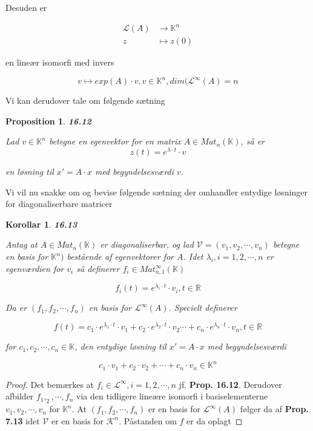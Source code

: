 \documentclass[paper=a4, fontsize=11pt]{scrartcl} %
\newtheorem*{korollar}{Korollar}
\newtheorem*{proposition}{Proposition}
\newenvironment{cstmproposition}[1]{\begin{proposition} {\normalfont\textbf{#1}}}{\end{proposition}}
\newenvironment{cstmkorollar}[1]{\begin{korollar} {\normalfont\textbf{#1}}}{\end{korollar}}
\begin{document}
			Desuden er 
			
			\begin{align*}
			\mathcal{L}(A) &\rightarrow \mathbb{K}^n\\
			z &\mapsto z(0)
			\end{align*}
			
			en lineær isomorfi med invers
			
			\[v \mapsto exp(A) \cdot v, v \in \mathbb{K}^n, dim(\mathcal{L}^{\infty}(A) = n\]
			
			Vi kan derudover tale om følgende sætning
			
			\begin{cstmproposition}{16.12}
				
				Lad $v \in \mathbb{K}^n$ betegne en egenvektor for en matrix $A \in Mat_n(\mathbb{K})$, så er 
				\[z(t) = e^{\lambda \cdot t} \cdot v\]
				
				en løsning til $x' = A \cdot x$ med begyndelsesværdi $v$.
				
			\end{cstmproposition}
			
			
			Vi vil nu snakke om og bevise følgende sætning der omhandler entydige løsninger for diagonaliserbare matricer
			
			\begin{cstmkorollar}{16.13}
				
				
				Antag at $A \in Mat_n(\mathbb{K})$ er diagonaliserbar, og lad $\mathcal{V} = (v_1,v_2,\cdots,v_n)$ betegne en basis for $\mathbb{K}^n)$ bestående af egenvektorer for $A$. Idet $\lambda_i, i = 1,2,\cdots,n$ er egenværdien for $v_i$ så definerer $f_i \in Mat_{n,1}^{\infty}(\mathbb{K})$ 
				
				\[f_i(t) = e^{\lambda_i \cdot t} \cdot v_i, t \in \mathbb{R}\]
				
				Da er $(f_1,f_2,\cdots,f_n)$ en basis for $\mathcal{L}^{\infty}(A)$. Specielt definerer
				
				\[f(t) = c_1 \cdot e^{\lambda_1 \cdot t} \cdot v_1 + c_2 \cdot e^{\lambda_2 \cdot t} \cdot v_2 \cdots + c_n \cdot e^{\lambda_n \cdot t} \cdot v_n, t \in \mathbb{R}\]
				
				for $c_1,c_2,\cdots,c_n \in \mathbb{K}$, den entydige løsning til $x' = A \cdot x$ med begyndelsesværdi 
				
				\[c_1 \cdot v_1 + c_2 \cdot v_2 + \cdots + c_n \cdot v_n \in \mathbb{K}^n\] 
				
			\end{cstmkorollar}
			
			\begin{proof}
				
				Det bemærkes at $f_i \in \mathcal{L}^{\infty}, i = 1,2,\cdots,n$ jf. \textbf{Prop. 16.12}. Derudover afbilder $f_1,_2,\cdots,f_n$ via den tidligere lineære isomorfi i basiselementerne $v_1,v_2,\cdots,v_n$ for $\mathbb{K}^n$. At $(f_1,f_2,\cdots,f_n)$ er en basis for $\mathcal{L}^{\infty}(A)$ følger da af \textbf{Prop. 7.13} idet $\mathcal{V}$ er en basis for $\mathcal{K}^n$. Påstanden om $f$ er da oplagt
				
			\end{proof}
			
			
			
			
		
\end{document}
